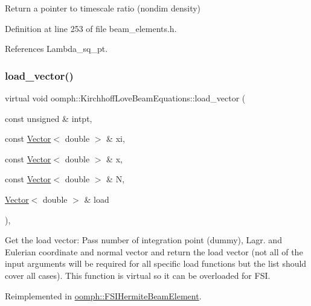 Return a pointer to timescale ratio (nondim density) 



Definition at line 253 of file beam\+\_\+elements.\+h.



References Lambda\+\_\+sq\+\_\+pt.

\mbox{\label{classoomph_1_1KirchhoffLoveBeamEquations_aef8e5b3abb7669c7292103d7061f10c6}} 
\subsubsection{\texorpdfstring{load\+\_\+vector()}{load\_vector()}}
{\footnotesize\ttfamily virtual void oomph\+::\+Kirchhoff\+Love\+Beam\+Equations\+::load\+\_\+vector (\begin{DoxyParamCaption}\item[{const unsigned \&}]{intpt,  }\item[{const \hyperlink{classoomph_1_1Vector}{Vector}$<$ double $>$ \&}]{xi,  }\item[{const \hyperlink{classoomph_1_1Vector}{Vector}$<$ double $>$ \&}]{x,  }\item[{const \hyperlink{classoomph_1_1Vector}{Vector}$<$ double $>$ \&}]{N,  }\item[{\hyperlink{classoomph_1_1Vector}{Vector}$<$ double $>$ \&}]{load }\end{DoxyParamCaption})\hspace{0.3cm}{\ttfamily [inline]}, {\ttfamily [virtual]}}



Get the load vector\+: Pass number of integration point (dummy), Lagr. and Eulerian coordinate and normal vector and return the load vector (not all of the input arguments will be required for all specific load functions but the list should cover all cases). This function is virtual so it can be overloaded for F\+SI. 



Reimplemented in \hyperlink{classoomph_1_1FSIHermiteBeamElement_aee4b8fcdef1a2247389bab8807d5db8e}{oomph\+::\+F\+S\+I\+Hermite\+Beam\+Element}.




